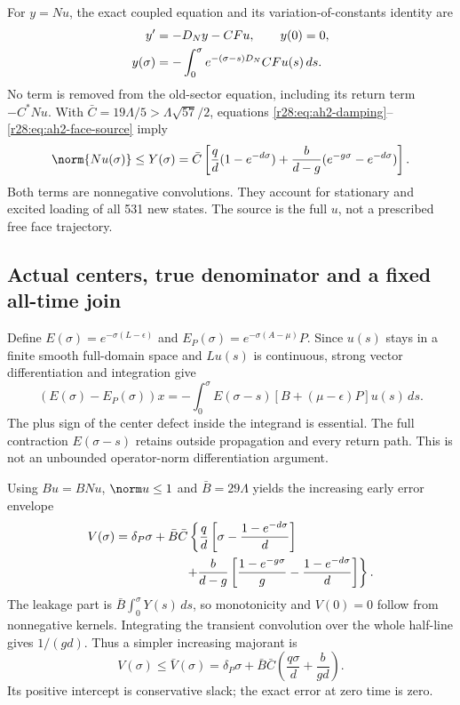 For $y=Nu$, the exact coupled equation and its variation-of-constants identity are
\begin{align}
 y'&=-D_Ny-CFu,\qquad y(0)=0,\notag\\
 y(\sigma)&=-\int_0^\sigma e^{-(\sigma-s)D_N}CFu(s)\,ds.
 \label{r28:eq:ah2-loading}
\end{align}
No term is removed from the old-sector equation, including its return term $-C^*Nu$. With $\bar C=19\Lambda/5>\Lambda\sqrt{57}/2$, equations \eqref{r28:eq:ah2-damping}--\eqref{r28:eq:ah2-face-source} imply
\begin{equation}
 \norm{Nu(\sigma)}\le Y(\sigma)
 =\bar C\left[\frac qd(1-e^{-d\sigma})+
 \frac b{d-g}(e^{-g\sigma}-e^{-d\sigma})\right].
 \label{r28:eq:ah2-Y}
\end{equation}
Both terms are nonnegative convolutions. They account for stationary and excited loading of all 531 new states. The source is the full $u$, not a prescribed free face trajectory.

\subsection{Actual centers, true denominator and a fixed all-time join}
Define $E(\sigma)=e^{-\sigma(L-\epsilon)}$ and $E_P(\sigma)=e^{-\sigma(A-\mu)}P$. Since $u(s)$ stays in a finite smooth full-domain space and $Lu(s)$ is continuous, strong vector differentiation and integration give
\begin{equation}
 (E(\sigma)-E_P(\sigma))x
 =-\int_0^\sigma E(\sigma-s)
 [B+(\mu-\epsilon)P]u(s)\,ds.
 \label{r28:eq:ah2-duhamel}
\end{equation}
The plus sign of the center defect inside the integrand is essential. The full contraction $E(\sigma-s)$ retains outside propagation and every return path. This is not an unbounded operator-norm differentiation argument.

Using $Bu=BNu$, $\norm u\le1$ and $\bar B=29\Lambda$ yields the increasing early error envelope
\begin{align}
 V(\sigma)={}&\delta_P\sigma+\bar B\bar C
 \left\{\frac qd\left[\sigma-\frac{1-e^{-d\sigma}}d\right]\right.\notag\\
 &\left.\hspace{15mm}+\frac b{d-g}
 \left[\frac{1-e^{-g\sigma}}g-\frac{1-e^{-d\sigma}}d\right]\right\}.
 \label{r28:eq:ah2-V}
\end{align}
The leakage part is $\bar B\int_0^\sigma Y(s)\,ds$, so monotonicity and $V(0)=0$ follow from nonnegative kernels. Integrating the transient convolution over the whole half-line gives $1/(gd)$. Thus a simpler increasing majorant is
\begin{equation}
 V(\sigma)\le\bar V(\sigma)
 =\delta_P\sigma+\bar B\bar C
 \left(\frac{q\sigma}d+\frac b{gd}\right).
 \label{r28:eq:ah2-affine}
\end{equation}
Its positive intercept is conservative slack; the exact error at zero time is zero.

